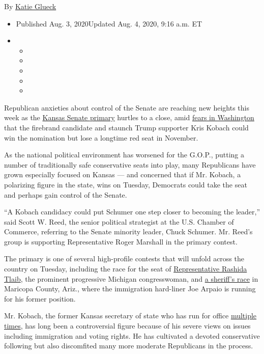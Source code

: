 By \href{https://www.nytimes.com/by/katie-glueck}{Katie Glueck}

\begin{itemize}
\item
  Published Aug. 3, 2020Updated Aug. 4, 2020, 9:16 a.m. ET
\item
  \begin{itemize}
  \item
  \item
  \item
  \item
  \item
  \end{itemize}
\end{itemize}

Republican anxieties about control of the Senate are reaching new
heights this week as the
\href{https://www.nytimes.com/2020/08/04/us/elections/primary-election-michigan-arizona-kansas.html}{Kansas
Senate primary} hurtles to a close, amid
\href{https://www.nytimes.com/2020/07/30/us/politics/kansas-senate-kobach-trump.html}{fears
in Washington} that the firebrand candidate and staunch Trump supporter
Kris Kobach could win the nomination but lose a longtime red seat in
November.

As the national political environment has worsened for the G.O.P.,
putting a number of traditionally safe conservative seats into play,
many Republicans have grown especially focused on Kansas --- and
concerned that if Mr. Kobach, a polarizing figure in the state, wins on
Tuesday, Democrats could take the seat and perhaps gain control of the
Senate.

``A Kobach candidacy could put Schumer one step closer to becoming the
leader,'' said Scott W. Reed, the senior political strategist at the
U.S. Chamber of Commerce, referring to the Senate minority leader, Chuck
Schumer. Mr. Reed's group is supporting Representative Roger Marshall in
the primary contest.

The primary is one of several high-profile contests that will unfold
across the country on Tuesday, including the race for the seat of
\href{https://www.nytimes.com/2020/07/18/us/rashida-tlaib-brenda-jones-primary.html}{Representative
Rashida Tlaib}, the prominent progressive Michigan congresswoman, and
\href{https://www.nytimes.com/2020/08/02/us/politics/arizona-election-joe-arpaio.html}{a
sheriff's race} in Maricopa County, Ariz., where the immigration
hard-liner Joe Arpaio is running for his former position.

Mr. Kobach, the former Kansas secretary of state who has run for office
\href{https://www.nytimes.com/2017/06/13/magazine/the-man-behind-trumps-voter-fraud-obsession.html}{multiple
times}, has long been a controversial figure because of his severe views
on issues including immigration and voting rights. He has cultivated a
devoted conservative following but also discomfited many more moderate
Republicans in the process.

